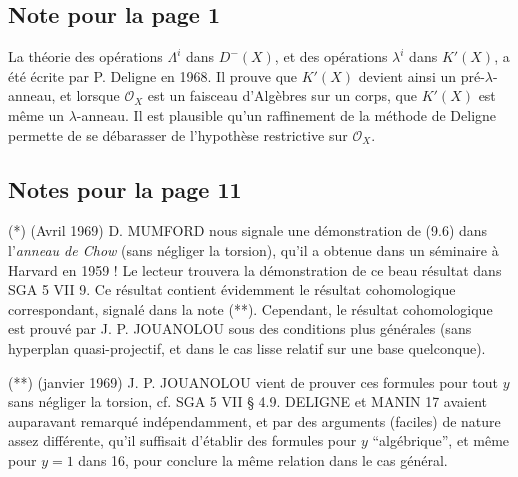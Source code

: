 
\subsection*{Note pour la page 1}

La théorie des opérations $\Lambda^i$ dans $D^-(X)$, et des opérations $\lambda^i$ dans $K'(X)$, a été écrite par P. Deligne en 1968. Il prouve que $K'(X)$ devient ainsi un pré-$\lambda$-anneau, et lorsque $\mathcal O_X$ est un faisceau d'Algèbres sur un corps, que $K'(X)$ est même un $\lambda$-anneau. Il est plausible qu'un raffinement de la méthode de Deligne permette de se débarasser de l'hypothèse restrictive sur $\mathcal O_X$.

\subsection*{Notes pour la page 11}

\noindent(*) (Avril 1969) D. MUMFORD nous signale une démonstration de (9.6) dans l'\emph{anneau de Chow} (sans négliger la torsion), qu'il a obtenue dans un séminaire à Harvard en 1959 ! Le lecteur trouvera la démonstration de ce beau résultat dans SGA 5 VII 9. Ce résultat contient évidemment le résultat cohomologique correspondant, signalé dans la note (**). Cependant, le résultat cohomologique est prouvé par J. P. JOUANOLOU sous des conditions plus générales (sans hyperplan quasi-projectif, et dans le cas lisse relatif sur une base quelconque).

\medskip

\noindent(**) (janvier 1969) J. P. JOUANOLOU vient de prouver ces formules pour tout $y$ sans négliger la torsion, cf. SGA 5 VII \S{} 4.9. DELIGNE et MANIN 17 avaient auparavant remarqué indépendamment, et par des arguments (faciles) de nature assez différente, qu'il suffisait d'établir des formules pour $y$ ``algébrique'', et même pour $y=1$ dans 16, pour conclure la même relation dans le cas général.



\providecommand{\Qcoh}{\operatorname{Qcoh}}
\providecommand{\Coh}{\operatorname{Coh}}
\providecommand{\Parf}{\operatorname{Parf}}
\providecommand{\Lib}{\operatorname{Lib}}
\providecommand{\Loclib}{\operatorname{Loclib}}
